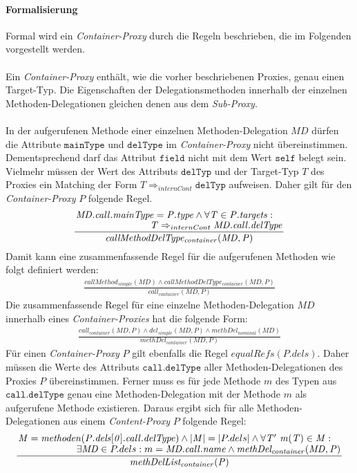 \paragraph{Formalisierung}
Formal wird ein \emph{Container-Proxy} durch die Regeln beschrieben, die im Folgenden vorgestellt werden.
\\\\
Ein \emph{Container-Proxy} enthält, wie die vorher beschriebenen Proxies, genau einen Target-Typ. Die Eigenschaften der Delegationsmethoden innerhalb der einzelnen Methoden-Delegationen gleichen denen aus dem \emph{Sub-Proxy}.
\\\\
In der aufgerufenen Methode einer einzelnen Methoden-Delegation $\mathit{MD}$ dürfen die Attribute $\texttt{mainType}$ und $\texttt{delType}$ im \emph{Container-Proxy} nicht übereinstimmen. Dementsprechend darf das Attribut $\texttt{field}$ nicht mit dem Wert $\texttt{self}$ belegt sein. Vielmehr müssen der Wert des Attributs $\texttt{delTyp}$ und der Target-Typ $T$ des Proxies ein Matching der Form $T \Rightarrow_{internCont} \texttt{delTyp}$ aufweisen. Daher gilt für den \emph{Container-Proxy} $P$ folgende Regel.
\begin{gather*}
\frac{\splitfrac{\mathit{MD.call.mainType} = \mathit{P.type} \wedge \forall \mathit{T} \in \mathit{P.targets}:}
{  \mathit{T} \Rightarrow_{internCont} \mathit{MD.call.delType}}
}
{\mathit{callMethodDelType_{container}(MD,P)}}
\end{gather*}
\noindent
Damit kann eine zusammenfassende Regel für die aufgerufenen Methoden wie folgt definiert werden:
\begin{gather*}
\frac{\mathit{callMethod_{simple}(MD)} \wedge \mathit{callMethodDelType_{container}(MD,P)}}
{\mathit{call_{container}(MD,P)}}
\end{gather*}
Die zusammenfassende Regel für eine einzelne Methoden-Delegation $\mathit{MD}$ innerhalb eines \emph{Container-Proxies} hat die folgende Form:
\begin{gather*}
\frac{\mathit{call_{container}(MD,P)} \wedge \mathit{del_{simple}(MD,P)} \wedge \mathit{methDel_{nominal}(MD)}}
{\mathit{methDel_{container}(MD,P)}}
\end{gather*}
Für einen \emph{Container-Proxy} $P$ gilt ebenfalls die Regel $\mathit{equalRefs(P.dels)}$. Daher müssen die Werte des Attributs $\texttt{call.delType}$ aller Methoden-Delegationen des Proxies $P$ übereinstimmen. Ferner muss es für jede Methode $m$ des Typen aus $\texttt{call.delType}$ genau eine Methoden-Delegation mit der Methode $m$ als aufgerufene Methode existieren. Daraus ergibt sich für alle Methoden-Delegationen aus einem \emph{Content-Proxy} $P$ folgende Regel:
\begin{gather*}
\frac{\splitfrac{\mathit{M} = \mathit{methoden(P.dels[0].call.delType)} \wedge |\mathit{M}| = |P.dels| \wedge \forall \mathit{T' \text{ } m(T)} \in \mathit{M}:}
{\exists \mathit{MD} \in P.dels:m = \mathit{MD.call.name} \wedge \mathit{methDel_{container}(MD,P)}
 }}
{\mathit{methDelList_{container}(P)}}
\end{gather*}



